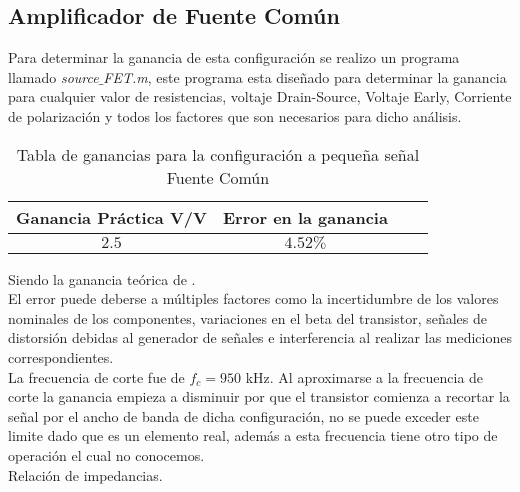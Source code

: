 \documentclass[11pt,graphicx,caption,rotating]{article}
\begin{document}
\subsection{Amplificador de Fuente Común}
\noindent
Para determinar la ganancia de esta configuración se realizo un programa llamado \textit{source$\_$FET.m}, este programa esta diseñado para determinar la ganancia para cualquier valor de resistencias, voltaje Drain-Source, Voltaje Early, Corriente de polarización y todos los factores que son necesarios para dicho análisis.
\begin{table}[H]
	\centering
\begin{tabular}[c]{|c|c|c|c|} \hline
\textbf{Ganancia Práctica} V/V & \textbf{Error en la ganancia} \\ \hline
$2.5$ & $4.52\%$ \\ \hline
\end{tabular}
	\caption{Tabla de ganancias para la configuración a pequeña señal Fuente Común}
	\label{tab12}
\end{table}
\noindent
Siendo la ganancia teórica de .\\
El error puede deberse a múltiples factores como la incertidumbre de los valores nominales de los componentes, variaciones en el beta del transistor, señales de distorsión debidas al generador de señales e interferencia al realizar las mediciones correspondientes.\\
La frecuencia de corte fue de $f_c=950$ kHz. Al aproximarse a la frecuencia de corte la ganancia empieza a disminuir por que el transistor comienza a recortar la señal por el ancho de banda de dicha configuración, no se puede exceder este limite dado que es un elemento real, además a esta frecuencia tiene otro tipo de operación el cual no conocemos. \\
Relación de impedancias.
\end{document}
